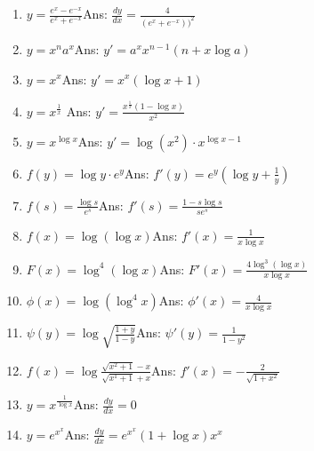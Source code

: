\begin{enumerate}
\item
$y = \frac{e^x - e^{-x}}{e^x + e^{-x}}$\qquad\qquad\qquad\qquad\qquad\qquad Ans: 	$\frac{dy}{dx} = \frac{4}{(e^x + e^{-x}))^2}$

\item
$y = x^na^x$\qquad\qquad\qquad\qquad\qquad\qquad Ans: 	$y' = a^xx^{n - 1}(n + x\log a)$

\item
$y = x^x$\qquad\qquad\qquad\qquad\qquad\qquad Ans: 	$y' = x^x(\log x + 1)$
\item
$y = x^{\frac{1}{x}}$
\qquad\qquad\qquad\qquad\qquad\qquad Ans: 
$y' = \frac{x^{\frac{1}{x}} (1 - \log x)}{x^2}$

\item
$y = x^{\log x}$\qquad\qquad\qquad\qquad\qquad\qquad Ans: 	$y' = \log (x^2) \cdot x^{\log x - 1}$

\item
$f(y) = \log y \cdot e^y$\qquad\qquad\qquad\qquad\qquad\qquad Ans: 	$f'(y) = e^y \left ( \log y + \frac{1}{y} \right )$

\item
$f(s) = \frac{\log s}{e^s}$\qquad\qquad\qquad\qquad\qquad\qquad Ans: 	$f'(s) = \frac{1 - s \log s}{s e^s}$

\item
$f(x) = \log(\log x)$\qquad\qquad\qquad\qquad\qquad\qquad Ans: 	$f'(x) = \frac{1}{x \log x}$

\item
$F(x) = \log^4(\log x)$\qquad\qquad\qquad\qquad\qquad\qquad Ans: 	$F'(x) = \frac{4 \log^3 (\log x)}{x \log x}$

\item
$\phi (x) = \log(\log^4x)$\qquad\qquad\qquad\qquad\qquad\qquad Ans: 	$\phi'(x) = \frac{4}{x \log x}$

\item
$\psi(y) = \log \sqrt{\frac{1 + y}{1 - y}}$\qquad\qquad\qquad\qquad\qquad\qquad Ans: 	$\psi'(y) = \frac{1}{1 - y^2}$

\item
$f(x) = \log \frac{\sqrt{x^2 + 1} - x}{\sqrt{x^1 + 1} + x}$\qquad\qquad\qquad\qquad\qquad\qquad Ans: 	$f'(x) = -\frac{2}{\sqrt{1 + x^2}}$

\item
$y = x^{\frac{1}{\log x}}$\qquad\qquad\qquad\qquad\qquad\qquad Ans: 	$\frac{dy}{dx} = 0$

\item
$y = e^{x^x}$\qquad\qquad\qquad\qquad\qquad\qquad Ans: 	$\frac{dy}{dx} = e^{x^x}(1 + \log x)x^x$


\end{enumerate}

